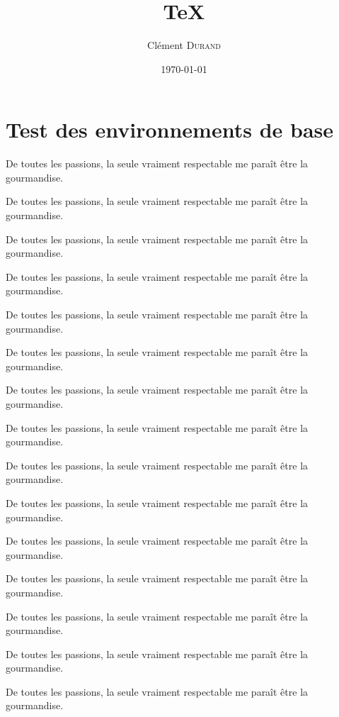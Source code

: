 \documentclass[a4paper,11pt,twocolumn]{article}
\title[Le sous-titre le plus débile de l'histoire de l'humanité]{\TeX\oldstylenums{101}}
\author[\nolinkurl{clement.durand+latex@polytechnique.edu}]{Clément \textsc{Durand}}
\date\today
\begin{document}
\maketitle

\section{Test des environnements de base}
	
	 De toutes les passions, la seule vraiment respectable me paraît être la gourmandise.
	
	 De toutes les passions, la seule vraiment respectable me paraît être la gourmandise.
	
	 De toutes les passions, la seule vraiment respectable me paraît être la gourmandise.
	
	\propriete{} De toutes les passions, la seule vraiment respectable me paraît être la gourmandise.
	
	 De toutes les passions, la seule vraiment respectable me paraît être la gourmandise.
	
	\lemme{} De toutes les passions, la seule vraiment respectable me paraît être la gourmandise.
	
	 De toutes les passions, la seule vraiment respectable me paraît être la gourmandise.
	
	\proposition{} De toutes les passions, la seule vraiment respectable me paraît être la gourmandise.
	
	 De toutes les passions, la seule vraiment respectable me paraît être la gourmandise.
	
	\corollaire{} De toutes les passions, la seule vraiment respectable me paraît être la gourmandise.
	
	 De toutes les passions, la seule vraiment respectable me paraît être la gourmandise.
	
	\theoreme{} De toutes les passions, la seule vraiment respectable me paraît être la gourmandise.
	
	 De toutes les passions, la seule vraiment respectable me paraît être la gourmandise.
	
	\formule{} De toutes les passions, la seule vraiment respectable me paraît être la gourmandise.
	
	 De toutes les passions, la seule vraiment respectable me paraît être la gourmandise.
	
\end{document}
